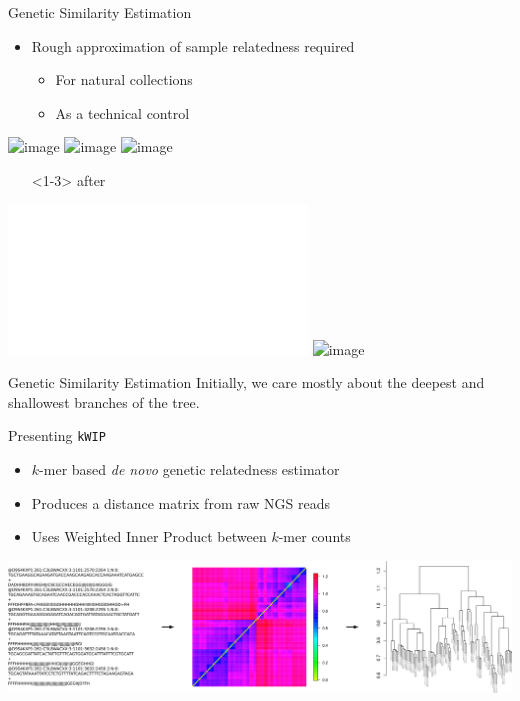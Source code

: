 \documentclass[t]{beamer}
\begin{document}
\begin{frame}{Genetic Similarity Estimation}
  \begin{itemize}
    \item Rough approximation of sample relatedness required
      \begin{itemize}
        \item For natural collections
        \item As a technical control
      \end{itemize}
  \end{itemize}
  \begin{center}
    \includegraphics<1>[width=\textwidth]{img/restruct-1}
    \includegraphics<2>[width=\textwidth]{img/restruct-2}
    \includegraphics<3>[width=\textwidth]{img/restruct-3}
    \begin{itemize}
      \item[]<1-3> \tiny{after \textcite{brachi_genome-wide_2011}}
    \end{itemize}
    \includegraphics<4>[width=\textwidth]{img/jared-tree.pdf}
    \includegraphics<5>[width=0.6\textwidth]{img/at80-tree.png}
  \end{center}
\end{frame}


\begin{frame}[c]{Genetic Similarity Estimation}
  \centering Initially, we care mostly about the deepest and shallowest
  branches of the tree.
\end{frame}

\begin{frame}{Presenting \texttt{kWIP}}
  \begin{itemize}
    \item $k$-mer based \textit{de novo} genetic relatedness estimator
    \item Produces a distance matrix from raw NGS reads
    \item Uses Weighted Inner Product between $k$-mer counts
  \end{itemize}
  \begin{center}
    \includegraphics[width=\textwidth]{img/kwip-overview.png}
  \end{center}
\end{frame}
\end{document}

